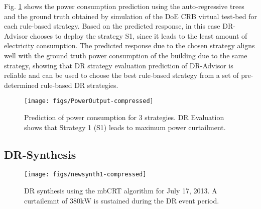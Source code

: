 \documentclass{sig-alternate-ipsn13}
\theoremstyle{definition}
\begin{document}
Fig. \ref{fig:case_eval_power} shows the power consumption prediction using the auto-regressive trees and the ground truth obtained by simulation of the DoE CRB virtual test-bed for each rule-based strategy. 
Based on the predicted response, in this case DR-Advisor chooses to deploy the strategy S1, since it leads to the least amount of electricity consumption. The predicted response due to the chosen strategy aligns well with the ground truth power consumption of the building due to the same strategy, showing that DR strategy evaluation prediction of DR-Advisor is reliable and can be used to choose the best rule-based strategy from a set of pre-determined rule-based DR strategies.

 \begin{figure}
\centering
\texttt{[image: figs/PowerOutput-compressed]}
\caption{Prediction of power consumption for 3 strategies. DR Evaluation shows that Strategy 1 (S1) leads to maximum power curtailment.}
\label{fig:case_eval_power}
\vspace{-10pt}
\end{figure}

\subsection{DR-Synthesis}
\label{sec:case_syn}

 \begin{figure}
\centering
\texttt{[image: figs/newsynth1-compressed]}
\caption{DR synthesis using the mbCRT algorithm for July 17, 2013. A curtailemnt of $380\si{\kilo\watt}$ is sustained during the DR event period.}
\label{fig:synthesis}
\vspace{-10pt}
\end{figure}
\end{document}
